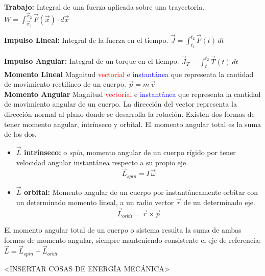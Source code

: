 \documentclass[12pt,a4paper]{article}
\begin{document}
\textbf{Trabajo:} Integral de una fuerza aplicada sobre una trayectoria. $\displaystyle W=\int_{\vec{x}_1}^{\vec{x}_2}\vec{F}(\vec{x})\cdot d\vec{x}$

\textbf{Impulso Lineal:} Integral de la fuerza en el tiempo. $\displaystyle \vec{J}=\int_{t_1}^{t_2}\vec{F}(t)\, dt$

\textbf{Impulso Angular:} Integral de un torque en el tiempo. $\displaystyle  \vec{J}_T=\int_{t_1}^{t_2}\vec{T}(t)\, dt$ \\

\textbf{Momento Lineal} Magnitud \textcolor{red}{vectorial} e \textcolor{blue}{instantánea} que representa la cantidad de movimiento rectilíneo de un cuerpo. $\displaystyle \vec{p}=m \, \vec{v}$ \\

\textbf{Momento Angular} Magnitud \textcolor{red}{vectorial} e \textcolor{blue}{instantánea} que representa la cantidad de movimiento angular de un cuerpo. La dirección del vector representa la dirección normal al plano donde se desarrolla la rotación.
Existen dos formas de tener momento angular, intrínseco y orbital. El momento angular total es la suma de los dos.

\begin{itemize}
	\item \textbf{$\vec{L}$ intrínseco:} o \textit{spin}, momento angular de un cuerpo rígido por tener velocidad angular instantánea respecto a su propio eje. $$\vec{L}_{spin} = I \, \vec{\omega}$$

	\item \textbf{$\vec{L}$ orbital:} Momento angular de un cuerpo por instantáneamente orbitar con un determinado momento lineal, a un radio vector $\vec{r}$ de un determinado eje. $$\vec{L}_{orbit} = \vec{r} \times \vec{p}$$
\end{itemize}

El momento angular total de un cuerpo o sistema resulta la suma de ambas formas de momento angular, siempre manteniendo consistente el eje de referencia: $\displaystyle \vec{L}=\vec{L}_{spin}+\vec{L}_{orbit}$


<INSERTAR COSAS DE ENERGÍA MECÁNICA>
\end{document}
